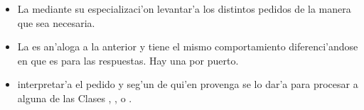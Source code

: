 \begin{itemize}
\item La  mediante su especializaci'on levantar'a los distintos pedidos de la manera que sea necesaria.

\item La  es an'aloga a la anterior y tiene el mismo comportamiento diferenci'andose en que es para las respuestas. Hay una por puerto.

\item {} interpretar'a el pedido y seg'un de qui'en provenga se lo dar'a para procesar a alguna de las Clases , ,  o . 

\end{itemize}



